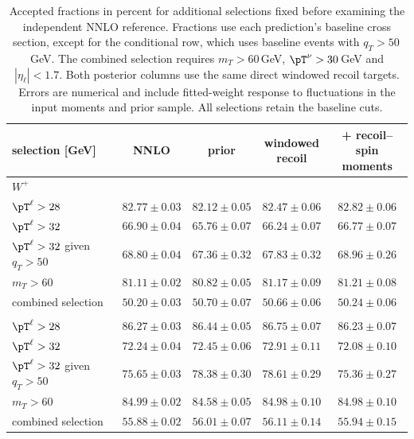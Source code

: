 \begin{table}[!htbp]
\centering
\tabsetup
\begin{tabular}{@{}lcccc@{}}
\toprule
selection [GeV] & NNLO & prior & \shortstack{windowed\\recoil} & \shortstack{+ recoil--spin\\moments} \\
\midrule
\multicolumn{5}{l}{$W^{+}$} \\
$\pT^\ell>28$ & $82.77\pm0.03$ & $82.12\pm0.05$ & $82.47\pm0.06$ & $82.82\pm0.06$ \\
$\pT^\ell>32$ & $66.90\pm0.04$ & $65.76\pm0.07$ & $66.24\pm0.07$ & $66.77\pm0.07$ \\
$\pT^\ell>32$ given $q_T>50$ & $68.80\pm0.04$ & $67.36\pm0.32$ & $67.83\pm0.32$ & $68.96\pm0.26$ \\
$m_T>60$ & $81.11\pm0.02$ & $80.82\pm0.05$ & $81.17\pm0.09$ & $81.21\pm0.08$ \\
combined selection & $50.20\pm0.03$ & $50.70\pm0.07$ & $50.66\pm0.06$ & $50.24\pm0.06$ \\
\addlinespace[3pt]
\multicolumn{5}{l}{$W^{-}$} \\
$\pT^\ell>28$ & $86.27\pm0.03$ & $86.44\pm0.05$ & $86.75\pm0.07$ & $86.23\pm0.07$ \\
$\pT^\ell>32$ & $72.24\pm0.04$ & $72.45\pm0.06$ & $72.91\pm0.11$ & $72.08\pm0.10$ \\
$\pT^\ell>32$ given $q_T>50$ & $75.65\pm0.03$ & $78.38\pm0.30$ & $78.61\pm0.29$ & $75.36\pm0.27$ \\
$m_T>60$ & $84.99\pm0.02$ & $84.58\pm0.05$ & $84.98\pm0.10$ & $84.98\pm0.10$ \\
combined selection & $55.88\pm0.02$ & $56.01\pm0.07$ & $56.11\pm0.14$ & $55.94\pm0.15$ \\
\bottomrule
\end{tabular}
\caption{Accepted fractions in percent for additional selections fixed before examining the independent NNLO reference. Fractions use each prediction's baseline cross section, except for the conditional row, which uses baseline events with $q_T>50\,$GeV. The combined selection requires $m_T>60\,$GeV, $\pT^\nu>30\,$GeV and $|\eta_\ell|<1.7$. Both posterior columns use the same direct windowed recoil targets. Errors are numerical and include fitted-weight response to fluctuations in the input moments and prior sample. All selections retain the baseline cuts.}
\label{tab:wacceptance}
\end{table}

